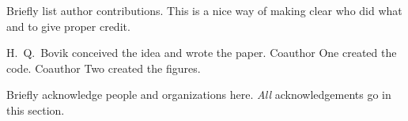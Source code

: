 \documentclass{uai2021} %
\begin{document}
\begin{contributions} %
    Briefly list author contributions.
    This is a nice way of making clear who did what and to give proper credit.

    H.~Q.~Bovik conceived the idea and wrote the paper.
    Coauthor One created the code.
    Coauthor Two created the figures.
\end{contributions}

\begin{acknowledgements} %
    Briefly acknowledge people and organizations here.
    \emph{All} acknowledgements go in this section.
\end{acknowledgements}



\appendix
\end{document}
